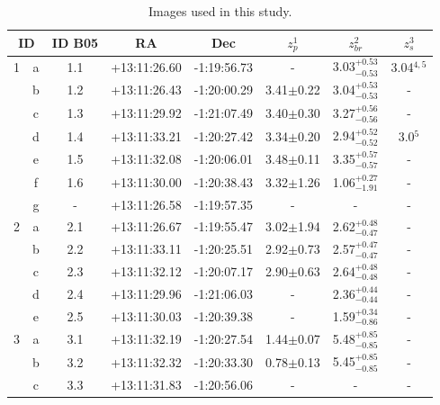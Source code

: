\documentclass[useAMS,usenatbib]{mn2e}
\begin{document}
\begin{table}
  \centering
  \caption[]{Images used in this study.}
  \begin{tabular}{cccccccc}
    \hline
    \multicolumn{2}{c}{ID} & ID B05 & RA & Dec & $z_p^1$ & $z_{br}^2$ & $z_s^3$ \\
    \hline
    \hline
        1 & a &  1.1 & +13:11:26.60 & -1:19:56.73 &      -        & 3.03$^{+0.53}_{-0.53}$ & 3.04$^{4,5}$ \\
          & b &  1.2 & +13:11:26.43 & -1:20:00.29 & 3.41$\pm$0.22 & 3.04$^{+0.53}_{-0.53}$ &       -      \\
          & c &  1.3 & +13:11:29.92 & -1:21:07.49 & 3.40$\pm$0.30 & 3.27$^{+0.56}_{-0.56}$ &       -      \\
          & d &  1.4 & +13:11:33.21 & -1:20:27.42 & 3.34$\pm$0.20 & 2.94$^{+0.52}_{-0.52}$ &  3.0$^{5}$   \\
          & e &  1.5 & +13:11:32.08 & -1:20:06.01 & 3.48$\pm$0.11 & 3.35$^{+0.57}_{-0.57}$ &       -      \\
          & f &  1.6 & +13:11:30.00 & -1:20:38.43 & 3.32$\pm$1.26 & 1.06$^{+0.27}_{-1.91}$ &       -      \\
          & g &   -  & +13:11:26.58 & -1:19:57.35 &      -        &          -             &       -      \\
     \hline	 						   			  					  
        2 & a &  2.1 & +13:11:26.67 & -1:19:55.47 & 3.02$\pm$1.94 & 2.62$^{+0.48}_{-0.47}$ &       -      \\
          & b &  2.2 & +13:11:33.11 & -1:20:25.51 & 2.92$\pm$0.73 & 2.57$^{+0.47}_{-0.47}$ &       -      \\
          & c &  2.3 & +13:11:32.12 & -1:20:07.17 & 2.90$\pm$0.63 & 2.64$^{+0.48}_{-0.48}$ &       -      \\
          & d &  2.4 & +13:11:29.96 & -1:21:06.03 &      -        & 2.36$^{+0.44}_{-0.44}$ &       -      \\
          & e &  2.5 & +13:11:30.03 & -1:20:39.38 &      -        & 1.59$^{+0.34}_{-0.86}$ &       -      \\
     \hline	 						   			  					  
        3 & a &  3.1 & +13:11:32.19 & -1:20:27.54 & 1.44$\pm$0.07 & 5.48$^{+0.85}_{-0.85}$ &       -      \\
          & b &  3.2 & +13:11:32.32 & -1:20:33.30 & 0.78$\pm$0.13 & 5.45$^{+0.85}_{-0.85}$ &       -      \\
          & c &  3.3 & +13:11:31.83 & -1:20:56.06 &      -        &          -             &       -      \\

\end{tabular}
\end{table}
\end{document}
